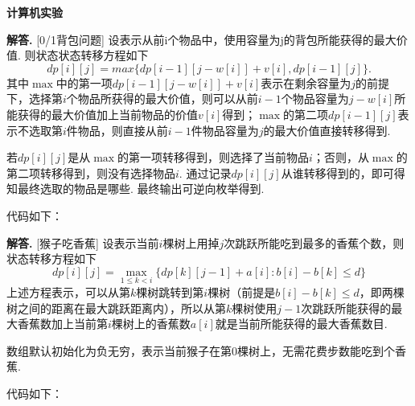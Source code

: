 \documentclass[12pt, a4paper, oneside]{ctexart}
\newenvironment{solution}[1][]{\par\noindent\textbf{#1解答. }}{\smallskip\par}
\let\leq=\leqslant %
\begin{document}
\pagestyle{plain}
\begin{center}
    \textbf{计算机实验}
\end{center}\vspace{-0.2cm}
\begin{solution}{[0/1背包问题]}
    设表示从前i个物品中，使用容量为j的背包所能获得的最大价值. 则状态状态转移方程如下
    \begin{equation*}
        dp[i][j] = max\{dp[i-1][j-w[i]]+v[i], dp[i-1][j]\}.
    \end{equation*}
    其中$\max$中的第一项$dp[i-1][j-w[i]]+v[i]$表示在剩余容量为$j$的前提下，选择第$i$个物品所获得的最大价值，则可以从前$i-1$个物品容量为$j-w[i]$所能获得的最大价值加上当前物品的价值$v[i]$得到；$\max$的第二项$dp[i-1][j]$表示不选取第$i$件物品，则直接从前$i-1$件物品容量为$j$的最大价值直接转移得到.

    若$dp[i][j]$是从$\max$的第一项转移得到，则选择了当前物品$i$；否则，从$\max$的第二项转移得到，则没有选择物品$i$. 通过记录$dp[i][j]$从谁转移得到的，即可得知最终选取的物品是哪些. 最终输出可逆向枚举得到.

    代码如下：
\end{solution}
\begin{solution}{[猴子吃香蕉]}
    设表示当前$i$棵树上用掉$j$次跳跃所能吃到最多的香蕉个数，则状态转移方程如下
    \begin{equation*}
        dp[i][j] = \max_{1\leq k < i}\{dp[k][j-1]+a[i]:b[i]-b[k]\leq d\}
    \end{equation*}
    上述方程表示，可以从第$k$棵树跳转到第$i$棵树（前提是$b[i]-b[k]\leq d$，即两棵树之间的距离在最大跳跃距离内），所以从第$k$棵树使用$j-1$次跳跃所能获得的最大香蕉数加上当前第$i$棵树上的香蕉数$a[i]$就是当前所能获得的最大香蕉数目.

    数组默认初始化为负无穷，表示当前猴子在第$0$棵树上，无需花费步数能吃到个香蕉.

    代码如下：
\end{solution}
\end{document}
